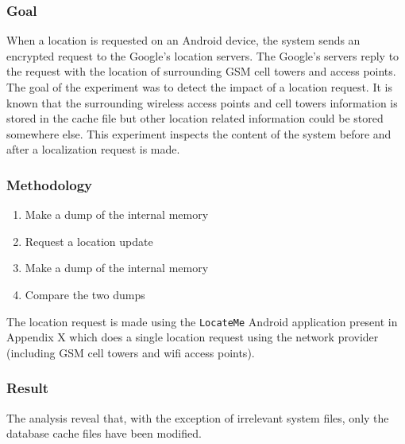 \subsubsection{Goal}

When a location is requested on an Android device, the system sends an encrypted request to the Google's location servers.
The Google's servers reply to the request with the location of surrounding GSM cell towers and access points.\\

The goal of the experiment was to detect the impact of a location request.
It is known that the surrounding wireless access points and cell towers information is stored in the cache file but other location related information could be stored somewhere else.
This experiment inspects the content of the system before and after a localization request is made.


\subsubsection{Methodology}

\begin{enumerate}
\item Make a dump of the internal memory
\item Request a location update
\item Make a dump of the internal memory
\item Compare the two dumps
\end{enumerate}

The location request is made using the \texttt{LocateMe} Android application present in Appendix X which does a single location request using the network provider (including GSM cell towers and wifi access points).

\subsubsection{Result}

The analysis reveal that, with the exception of irrelevant system files, only the database cache files have been modified.\\


